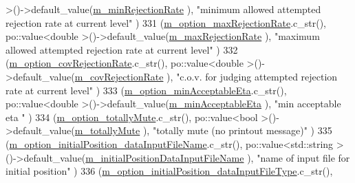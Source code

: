 \begin{DoxyCode}
            >()->default\_value(\hyperlink{class_q_u_e_s_o_1_1_m_l_sampling_level_options_a6010e1a97f0712b376653819aa6cdbca}{m\_minRejectionRate}                         ), \textcolor{stringliteral}{"minimum allowed
       attempted rejection rate at current level"}       )
331     (\hyperlink{class_q_u_e_s_o_1_1_m_l_sampling_level_options_ae226db9c741e8d6652f30c81cde61899}{m\_option\_maxRejectionRate}.c\_str(),                           po::value<double
            >()->default\_value(\hyperlink{class_q_u_e_s_o_1_1_m_l_sampling_level_options_ad7ec8ef589c49609d0082d3eb514bb13}{m\_maxRejectionRate}                         ), \textcolor{stringliteral}{"maximum allowed
       attempted rejection rate at current level"}       )
332     (\hyperlink{class_q_u_e_s_o_1_1_m_l_sampling_level_options_a3a8c05911fea3a80ff8efe3e046ba5e9}{m\_option\_covRejectionRate}.c\_str(),                           po::value<double
            >()->default\_value(\hyperlink{class_q_u_e_s_o_1_1_m_l_sampling_level_options_a8efaf9dfed7ff9f87c9a40aa8e8217a8}{m\_covRejectionRate}                         ), \textcolor{stringliteral}{"c.o.v. for judging
       attempted rejection rate at current level"}    )
333     (\hyperlink{class_q_u_e_s_o_1_1_m_l_sampling_level_options_a3af49d715cf211ed67e5206bc0d1840d}{m\_option\_minAcceptableEta}.c\_str(),                           po::value<double
            >()->default\_value(\hyperlink{class_q_u_e_s_o_1_1_m_l_sampling_level_options_a8230c7dd67833668237d3dc5b19c53c5}{m\_minAcceptableEta}                         ), \textcolor{stringliteral}{"min acceptable eta
      "}                                              )
334     (\hyperlink{class_q_u_e_s_o_1_1_m_l_sampling_level_options_a303f13a4f8fe1fb586ada0b95c0c2f8c}{m\_option\_totallyMute}.c\_str(),                                po::value<bool       
       >()->default\_value(\hyperlink{class_q_u_e_s_o_1_1_m_l_sampling_level_options_aeb5b3d634be08ac24bdc008ecfbf08b6}{m\_totallyMute}                              ), \textcolor{stringliteral}{"totally mute (no printout
       message)"}                              )
335     (\hyperlink{class_q_u_e_s_o_1_1_m_l_sampling_level_options_a08ae170166172f72b1b98e523ce0d71c}{m\_option\_initialPosition\_dataInputFileName}.c\_str(),         
       po::value<std::string >()->default\_value(\hyperlink{class_q_u_e_s_o_1_1_m_l_sampling_level_options_ac27dd9d3b5a376bfd146caa62fa32613}{m\_initialPositionDataInputFileName}
               ), \textcolor{stringliteral}{"name of input file for initial position"}                         )
336     (\hyperlink{class_q_u_e_s_o_1_1_m_l_sampling_level_options_a562837ca20c890940f09e7ea90b5aaf4}{m\_option\_initialPosition\_dataInputFileType}.c\_str(),         

\end{DoxyCode}
